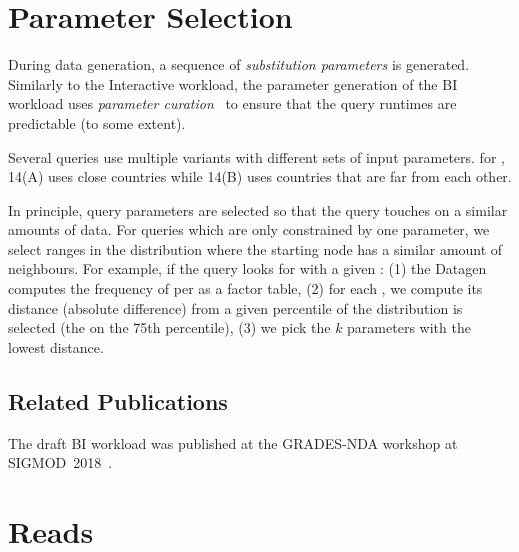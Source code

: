 \section{Parameter Selection}
\label{sec:bi-paramgen}

During data generation, a sequence of \emph{substitution parameters}
\iftoggle{StandaloneWorkloadSpecification}{}{(\autoref{sec:substitution-parameters})}
is generated.
Similarly to the Interactive workload, the parameter generation of the BI workload uses \emph{parameter curation}~\cite{DBLP:conf/tpctc/GubichevB14} to ensure that the query runtimes are  predictable (to some extent).

Several queries use multiple variants with different sets of input parameters.
\Eg for , 14(A) uses close countries while 14(B) uses countries that are far from each other.

In principle, query parameters are selected so that the query touches on a similar amounts of data.
For queries which are only constrained by one parameter, we select ranges in the distribution where the starting node has a similar amount of neighbours.
For example, if the query looks for \tMessages with a given \tTag:
(1) the Datagen computes the frequency of \tMessages per \tTags as a factor table,
(2) for each \tTag, we compute its distance (absolute difference) from a given percentile of the distribution is selected (\eg the \tTag on the 75th percentile),
(3) we pick the $k$ parameters with the lowest distance.

\subsection*{Related Publications}

The draft BI workload was published at the \mbox{GRADES-NDA} workshop at \mbox{SIGMOD 2018}~\cite{DBLP:conf/grades/SzarnyasPAMPKEB18}.


\section{Reads}
\label{sec:bi-reads}




